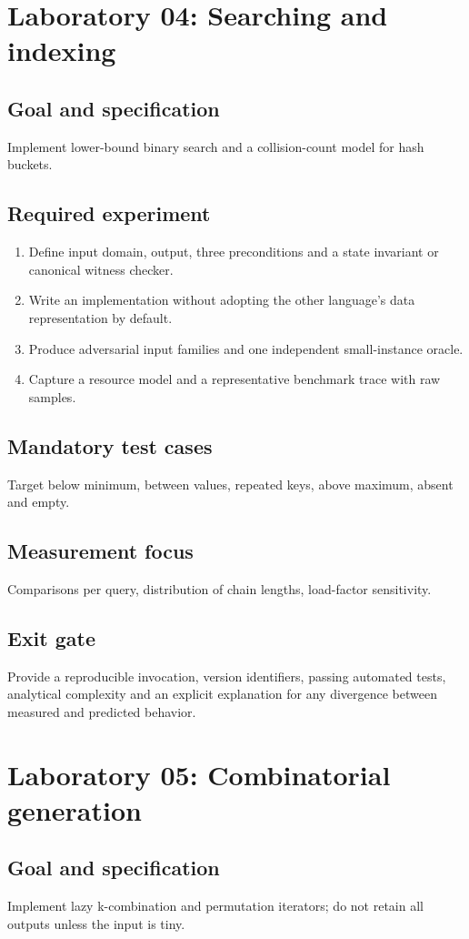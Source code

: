 \documentclass[11pt,letterpaper]{article}
\begin{document}
\section{Laboratory 04: Searching and indexing}
\subsection{Goal and specification}
Implement lower-bound binary search and a collision-count model for hash buckets.
\subsection{Required experiment}
\begin{enumerate}
\item Define input domain, output, three preconditions and a state invariant or canonical witness checker.
\item Write an implementation without adopting the other language's data representation by default.
\item Produce adversarial input families and one independent small-instance oracle.
\item Capture a resource model and a representative benchmark trace with raw samples.
\end{enumerate}
\subsection{Mandatory test cases}
Target below minimum, between values, repeated keys, above maximum, absent and empty.
\subsection{Measurement focus}
Comparisons per query, distribution of chain lengths, load-factor sensitivity.
\subsection{Exit gate}
Provide a reproducible invocation, version identifiers, passing automated tests, analytical complexity and an explicit explanation for any divergence between measured and predicted behavior.

\section{Laboratory 05: Combinatorial generation}
\subsection{Goal and specification}
Implement lazy k-combination and permutation iterators; do not retain all outputs unless the input is tiny.
\end{document}
